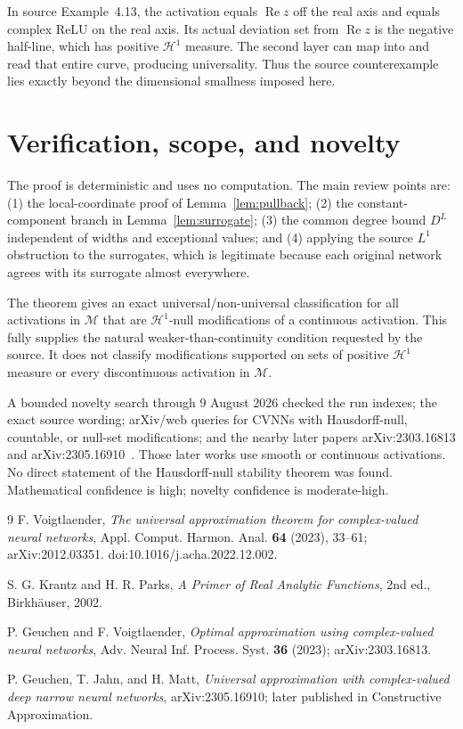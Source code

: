 \documentclass[11pt]{article}
\theoremstyle{remark}
\newcommand{\M}{\mathcal M}
\newcommand{\HH}{\mathcal H}
\begin{document}
In source Example~4.13, the activation equals $\operatorname{Re}z$ off the
real axis and equals complex ReLU on the real axis.  Its actual deviation set
from $\operatorname{Re}z$ is the negative half-line, which has positive
$\HH^1$ measure.  The second layer can map into and read that entire curve,
producing universality.  Thus the source counterexample lies exactly beyond
the dimensional smallness imposed here.

\section{Verification, scope, and novelty}

The proof is deterministic and uses no computation.  The main review points
are: (1) the local-coordinate proof of Lemma~\ref{lem:pullback}; (2) the
constant-component branch in Lemma~\ref{lem:surrogate}; (3) the common degree
bound $D^L$ independent of widths and exceptional values; and (4) applying
the source $L^1$ obstruction to the surrogates, which is legitimate because
each original network agrees with its surrogate almost everywhere.

The theorem gives an exact universal/non-universal classification for all
activations in $\M$ that are $\HH^1$-null modifications of a continuous
activation.  This fully supplies the natural weaker-than-continuity condition
requested by the source.  It does not classify modifications supported on
sets of positive $\HH^1$ measure or every discontinuous activation in $\M$.

A bounded novelty search through 9 August 2026 checked the run indexes; the
exact source wording; arXiv/web queries for CVNNs with Hausdorff-null,
countable, or null-set modifications; and the nearby later papers
arXiv:2303.16813 and arXiv:2305.16910~\cite{optimal,narrow}.  Those later
works use smooth or continuous activations.  No direct statement of the
Hausdorff-null stability theorem was found.  Mathematical confidence is high;
novelty confidence is moderate-high.

\begin{thebibliography}{9}
F. Voigtlaender,
\emph{The universal approximation theorem for complex-valued neural networks},
Appl. Comput. Harmon. Anal. \textbf{64} (2023), 33--61;
arXiv:2012.03351. doi:10.1016/j.acha.2022.12.002.

S. G. Krantz and H. R. Parks,
\emph{A Primer of Real Analytic Functions}, 2nd ed.,
Birkh\"auser, 2002.

P. Geuchen and F. Voigtlaender,
\emph{Optimal approximation using complex-valued neural networks},
Adv. Neural Inf. Process. Syst. \textbf{36} (2023);
arXiv:2303.16813.

P. Geuchen, T. Jahn, and H. Matt,
\emph{Universal approximation with complex-valued deep narrow neural networks},
arXiv:2305.16910; later published in Constructive Approximation.
\end{thebibliography}
\end{document}
